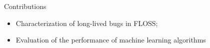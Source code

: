 \begin{frame}[t,fragile]{Contributions}
	\begin{itemize}
		\item \alert{Characterization} of long-lived bugs in FLOSS;
		\item Evaluation of the \alert{performance} of machine learning algorithms
	\end{itemize}
\end{frame}
%
%  

